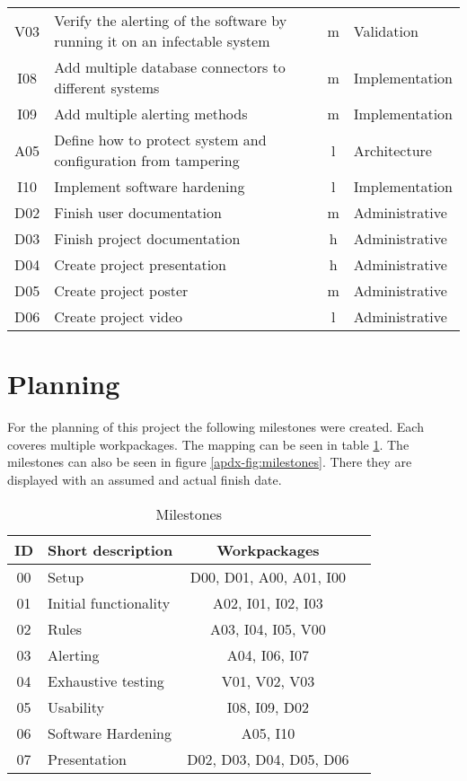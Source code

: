 \documentclass[
	a4paper,					%
	10pt,							%
	twoside,					%
	openright,				%
	notitlepage,			%
	parskip=half,			%
]{scrreprt}					%
\begin{document}
\begin{table}[h!]
\begin{center}
\begin{tabular}{c|l|c|l}
			V03 & Verify the alerting of the software by running it on an infectable system & m & Validation \\
			I08 & Add multiple database connectors to different systems & m & Implementation \\
			I09 & Add multiple alerting methods & m & Implementation \\
			A05 & Define how to protect system and configuration from tampering & l & Architecture \\
			I10 & Implement software hardening & l & Implementation \\
			D02 & Finish user documentation & m & Administrative \\
			D03 & Finish project documentation & h & Administrative \\ 
			D04 & Create project presentation & h & Administrative \\
			D05 & Create project poster & m & Administrative \\
			D06 & Create project video & l & Administrative \\
    \end{tabular}
  \end{center}
\end{table}

\section{Planning}

For the planning of this project the following milestones were created. Each coveres multiple workpackages. The mapping can be seen in table \ref{tab:milestones}. The milestones can also be seen in figure \ref{apdx-fig:milestones}. There they are displayed with an assumed and actual finish date.



\begin{table}[h!]
  \begin{center}
    \caption{Milestones}
    \label{tab:milestones}
    \begin{tabular}{c|l|c|l}
      \textbf{ID} & \textbf{Short description} & \textbf{Workpackages} \\
      \hline
			00 & Setup & D00, D01, A00, A01, I00 \\
			01 & Initial functionality & A02, I01, I02, I03 \\
			02 & Rules & A03, I04, I05, V00 \\
			03 & Alerting & A04, I06, I07 \\
			04 & Exhaustive testing & V01, V02, V03 \\
			05 & Usability & I08, I09, D02 \\
			06 & Software Hardening & A05, I10 \\
			07 & Presentation & D02, D03, D04, D05, D06 \\
    \end{tabular}
  \end{center}
\end{table}
\end{document}
